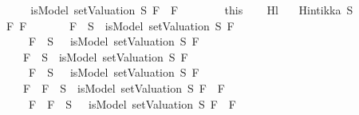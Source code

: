 \begin{isabellebody}
\ \ \ \ \isamarkupfalse%
\ \isamarkupfalse%
\ {\isachardoublequoteopen}{\isasymnot}\ isModel\ {\isacharparenleft}setValuation\ S{\isacharparenright}\ {\isacharparenleft}F{}\ \isactrlbold {\isasymrightarrow}\ F{}{\isacharparenright}{\isachardoublequoteclose}\isanewline
\ \ \ \ \ \ \isamarkupfalse%
\ this\isanewline
\ \ \isamarkupfalse%
\isanewline
{}\isamarkupfalse%
%
\endisatagproof
{\isafoldproof}%
%
\isadelimproof
\isanewline
%
\endisadelimproof
\isanewline
{}\isamarkupfalse%
\ Hl{}{\isacharunderscore}{}{\isacharcolon}\isanewline
\ \ \ {\isachardoublequoteopen}Hintikka\ S{\isachardoublequoteclose}\isanewline
\ \ \ {\isachardoublequoteopen}\ {\isasymAnd}F{}\ F{}{\isachardot}\isanewline
\ \ \ \ \ \ \ {\isacharparenleft}F{}\ {\isasymin}\ S\ {\isasymlongrightarrow}\ isModel\ {\isacharparenleft}setValuation\ S{\isacharparenright}\ F{}{\isacharparenright}\ {\isasymand}\isanewline
\ \ \ \ \ \ \ {\isacharparenleft}\isactrlbold {\isasymnot}\ F{}\ {\isasymin}\ S\ {\isasymlongrightarrow}\ {\isasymnot}\ isModel\ {\isacharparenleft}setValuation\ S{\isacharparenright}\ F{}{\isacharparenright}\ {\isasymLongrightarrow}\isanewline
\ \ \ \ \ \ \ {\isacharparenleft}F{}\ {\isasymin}\ S\ {\isasymlongrightarrow}\ isModel\ {\isacharparenleft}setValuation\ S{\isacharparenright}\ F{}{\isacharparenright}\ {\isasymand}\isanewline
\ \ \ \ \ \ \ {\isacharparenleft}\isactrlbold {\isasymnot}\ F{}\ {\isasymin}\ S\ {\isasymlongrightarrow}\ {\isasymnot}\ isModel\ {\isacharparenleft}setValuation\ S{\isacharparenright}\ F{}{\isacharparenright}\ {\isasymLongrightarrow}\isanewline
\ \ \ \ \ \ \ {\isacharparenleft}F{}\ \isactrlbold {\isasymrightarrow}\ F{}\ {\isasymin}\ S\ {\isasymlongrightarrow}\ isModel\ {\isacharparenleft}setValuation\ S{\isacharparenright}\ {\isacharparenleft}F{}\ \isactrlbold {\isasymrightarrow}\ F{}{\isacharparenright}{\isacharparenright}\ {\isasymand}\isanewline
\ \ \ \ \ \ \ {\isacharparenleft}\isactrlbold {\isasymnot}\ {\isacharparenleft}F{}\ \isactrlbold {\isasymrightarrow}\ F{}{\isacharparenright}\ {\isasymin}\ S\ {\isasymlongrightarrow}\ {\isasymnot}\ isModel\ {\isacharparenleft}setValuation\ S{\isacharparenright}\ {\isacharparenleft}F{}\ \isactrlbold {\isasymrightarrow}\ F{}{\isacharparenright}{\isacharparenright}{\isachardoublequoteclose}\isanewline

\end{isabellebody}
